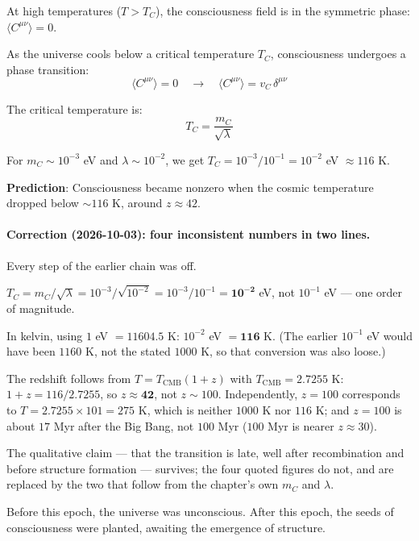 \begin{level2}
At high temperatures ($T > T_C$), the consciousness field is in the symmetric phase: $\langle C^{\mu\nu} \rangle = 0$.

As the universe cools below a critical temperature $T_C$, consciousness undergoes a phase transition:
\begin{equation}
\langle C^{\mu\nu} \rangle = 0 \quad \to \quad \langle C^{\mu\nu} \rangle = v_C \, \delta^{\mu\nu}
\end{equation}

The critical temperature is:
\begin{equation}
T_C = \frac{m_C}{\sqrt{\lambda}}
\end{equation}

For $m_C \sim 10^{-3}$ eV and $\lambda \sim 10^{-2}$, we get
$T_C = 10^{-3}/10^{-1} = 10^{-2}$ eV $\approx 116$ K.

\textbf{Prediction}: Consciousness became nonzero when the cosmic temperature
dropped below $\sim 116$ K, around $z \approx 42$.

\paragraph{Correction (2026-10-03): four inconsistent numbers in two lines.}
Every step of the earlier chain was off.

$T_C = m_C/\sqrt\lambda = 10^{-3}/\sqrt{10^{-2}} = 10^{-3}/10^{-1} =
\mathbf{10^{-2}}$ eV, not $10^{-1}$ eV --- one order of magnitude.

In kelvin, using $1$ eV $= 11604.5$ K: $10^{-2}$ eV $= \mathbf{116}$ K. (The
earlier $10^{-1}$ eV would have been $1160$ K, not the stated $1000$ K, so that
conversion was also loose.)

The redshift follows from $T = T_{\text{CMB}}(1+z)$ with
$T_{\text{CMB}} = 2.7255$ K: $1 + z = 116/2.7255$, so
$z \approx \mathbf{42}$, not $z \sim 100$. Independently, $z = 100$ corresponds
to $T = 2.7255 \times 101 = 275$ K, which is neither $1000$ K nor $116$ K; and
$z = 100$ is about $17$ Myr after the Big Bang, not $100$ Myr ($100$ Myr is
nearer $z \approx 30$).

The qualitative claim --- that the transition is late, well after recombination
and before structure formation --- survives; the four quoted figures do not, and
are replaced by the two that follow from the chapter's own $m_C$ and $\lambda$.

Before this epoch, the universe was unconscious. After this epoch, the seeds of consciousness were planted, awaiting the emergence of structure.
\end{level2}

